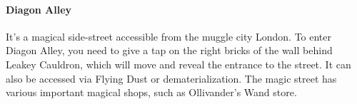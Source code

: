 \paragraph{Diagon Alley}
It's a magical side-street accessible from the muggle city London. To enter Diagon Alley, you need to give a tap on the right bricks of the wall behind Leakey Cauldron, which will move and reveal the entrance to the street. It can also be accessed via Flying Dust or dematerialization. The magic street has various important magical shops, such as Ollivander's Wand store.

\pagebreak
